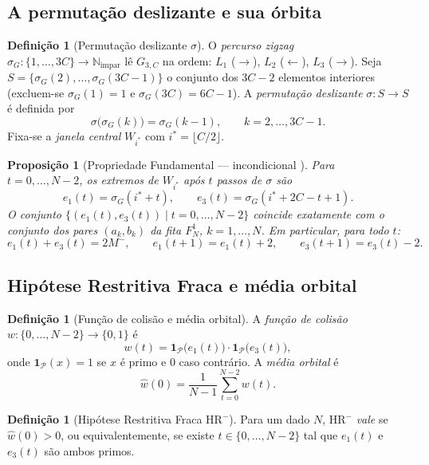 \documentclass[12pt,a4paper]{article}
\newtheorem{proposition}[theorem]{Proposição}
\theoremstyle{definition}
\newtheorem{definition}[theorem]{Definição}
\newcommand{\N}{\mathbb{N}}
\newcommand{\PP}{\mathcal{P}}          %
\newcommand{\HRm}{\mathrm{HR}^{-}}
\newcommand{\1}[1]{\mathbf{1}_{#1}}
\begin{document}
	\subsection{A permutação deslizante e sua órbita}
	
	\begin{definition}[Permutação deslizante $\sigma$]
		O \emph{percurso zigzag} $\sigma_G : \{1,\ldots,3C\} \to \N_{\mathrm{ímpar}}$
		lê $G_{3,C}$ na ordem: $L_1$ ($\to$), $L_2$ ($\leftarrow$), $L_3$ ($\to$).
		Seja $S = \{\sigma_G(2),\ldots,\sigma_G(3C-1)\}$ o conjunto dos $3C-2$
		elementos interiores (excluem-se $\sigma_G(1) = 1$ e $\sigma_G(3C) = 6C-1$).
		A \emph{permutação deslizante} $\sigma : S \to S$ é definida por
		\[
		\sigma\!\bigl(\sigma_G(k)\bigr) = \sigma_G(k-1), \qquad
		k = 2,\ldots,3C-1.
		\]
		Fixa-se a \emph{janela central} $W_{i^*}$ com $i^* = \lfloor C/2 \rfloor$.
	\end{definition}
	
	\begin{proposition}[Propriedade Fundamental --- incondicional {\cite[Prop.~4.3, 4.6]{motor}}]
		\label{prop:fund}
		Para $t = 0,\ldots,N-2$, os extremos de $W_{i^*}$ após $t$ passos de
		$\sigma$ são
		\[
		e_1(t) = \sigma_G(i^* + t), \qquad
		e_3(t) = \sigma_G(i^* + 2C - t + 1).
		\]
		O conjunto $\{(e_1(t), e_3(t)) \mid t = 0,\ldots,N-2\}$ coincide exatamente
		com o conjunto dos pares $(a_k, b_k)$ da fita $F_N^1$, $k = 1,\ldots,N$.
		Em particular, para todo $t$:
		\[
		e_1(t) + e_3(t) = 2M^-, \qquad
		e_1(t+1) = e_1(t) + 2, \qquad
		e_3(t+1) = e_3(t) - 2.
		\]
	\end{proposition}
	
	\subsection{Hipótese Restritiva Fraca e média orbital}
	
	\begin{definition}[Função de colisão e média orbital]
		\label{def:peso}
		A \emph{função de colisão} $w : \{0,\ldots,N-2\} \to \{0,1\}$ é
		\[
		w(t) = \1{\PP}\!\bigl(e_1(t)\bigr) \cdot \1{\PP}\!\bigl(e_3(t)\bigr),
		\]
		onde $\1{\PP}(x) = 1$ se $x$ é primo e $0$ caso contrário.
		A \emph{média orbital} é
		\[
		\widehat{w}(0) = \frac{1}{N-1}\sum_{t=0}^{N-2} w(t).
		\]
	\end{definition}
	
	\begin{definition}[Hipótese Restritiva Fraca $\HRm$]
		\label{def:HR}
		Para um dado $N$, $\HRm$ \emph{vale} se $\widehat{w}(0) > 0$,
		ou equivalentemente, se existe $t \in \{0,\ldots,N-2\}$ tal que
		$e_1(t)$ e $e_3(t)$ são ambos primos.
	\end{definition}
	
\end{document}
